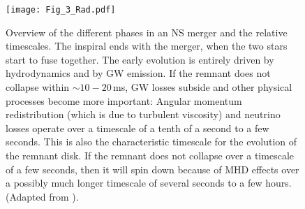 
\begin{figure}[t]
    \centering
    \texttt{[image: Fig\_3\_Rad.pdf]}
    \caption{
        Overview of the different phases in an \ac{NS} merger and the relative timescales. 
        The inspiral ends with the merger, when the two stars start to fuse together. 
        The early \pmerg{} evolution is entirely driven by hydrodynamics and by \ac{GW} emission. 
        If the remnant does not collapse within ${\sim}10-20\,$ms, \ac{GW} losses
        subside and other physical processes become more important: 
        Angular momentum redistribution (which is due to turbulent viscosity) 
        and neutrino losses operate over a timescale of a tenth of a second to a few
        seconds. This is also the characteristic timescale for the evolution of the remnant disk. 
        If the remnant does not collapse over a timescale of a few seconds, then it will 
        spin down because of \ac{MHD} effects over a possibly much longer timescale 
        of several seconds to a few hours. 
        (Adapted from \citet{Radice:2020ddv}).
    }
    \label{fig:intro:RadFig1}
\end{figure}


